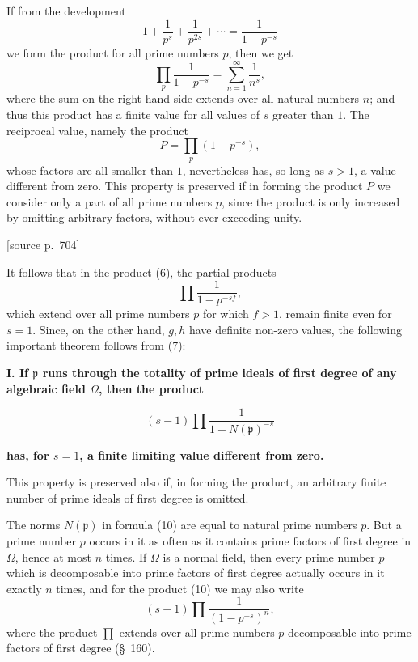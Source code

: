 \documentclass[11pt]{article}
\newcommand{\srcpage}[1]{\par\medskip\noindent\textsf{[source p.~#1]}\par\smallskip}
\begin{document}
If from the development
\[
1+\frac1{p^s}+\frac1{p^{2s}}+\cdots=\frac1{1-p^{-s}}
\]
we form the product for all prime numbers $p$, then we get
\begin{equation}
\prod_p\frac1{1-p^{-s}}=\sum_{n=1}^{\infty}\frac1{n^s},
\tag{8}
\end{equation}
where the sum on the right-hand side extends over all natural numbers $n$; and thus this product has a finite value for all values of $s$ greater than $1$. The reciprocal value, namely the product
\begin{equation}
P=\prod_p(1-p^{-s}),
\tag{9}
\end{equation}
whose factors are all smaller than $1$, nevertheless has, so long as $s>1$, a value different from zero. This property is preserved if in forming the product $P$ we consider only a part of all prime numbers $p$, since the product is only increased by omitting arbitrary factors, without ever exceeding unity.

\srcpage{704}
It follows that in the product (6), the partial products
\[
\prod\frac1{1-p^{-sf}},
\]
which extend over all prime numbers $p$ for which $f>1$, remain finite even for $s=1$. Since, on the other hand, $g,h$ have definite non-zero values, the following important theorem follows from (7):

\begin{center}
\textbf{I. If $\mathfrak p$ runs through the totality of prime ideals of first degree of any algebraic field $\Omega$, then the product}
\end{center}
\begin{equation}
(s-1)\prod\frac1{1-N(\mathfrak p)^{-s}}
\tag{10}
\end{equation}
\begin{center}
\textbf{has, for $s=1$, a finite limiting value different from zero.}
\end{center}

This property is preserved also if, in forming the product, an arbitrary finite number of prime ideals of first degree is omitted.

The norms $N(\mathfrak p)$ in formula (10) are equal to natural prime numbers $p$. But a prime number $p$ occurs in it as often as it contains prime factors of first degree in $\Omega$, hence at most $n$ times. If $\Omega$ is a normal field, then every prime number $p$ which is decomposable into prime factors of first degree actually occurs in it exactly $n$ times, and for the product (10) we may also write
\[
(s-1)\prod\frac1{(1-p^{-s})^n},
\]
where the product $\prod$ extends over all prime numbers $p$ decomposable into prime factors of first degree (\S~160).
\end{document}
